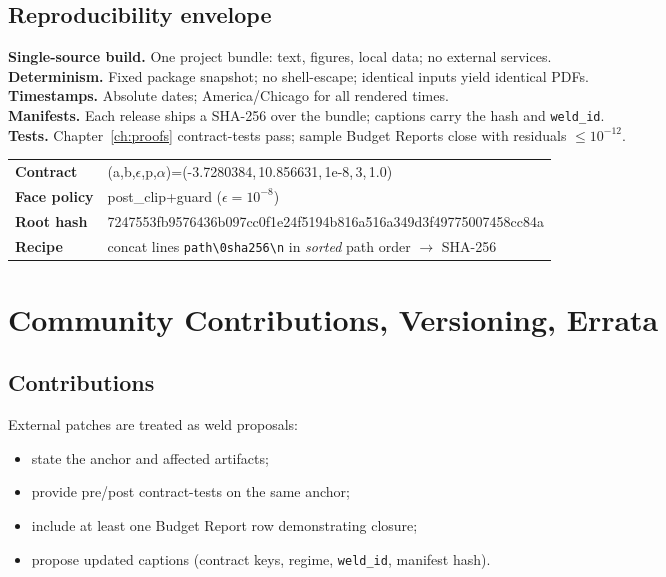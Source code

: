 \subsection*{Reproducibility envelope}
\begin{eqbox}
\textbf{Single-source build.} One project bundle: text, figures, local data; no external services.\\
\textbf{Determinism.} Fixed package snapshot; no shell-escape; identical inputs yield identical PDFs.\\
\textbf{Timestamps.} Absolute dates; America/Chicago for all rendered times.\\
\textbf{Manifests.} Each release ships a SHA-256 over the bundle; captions carry the hash and \texttt{weld\_id}.\\
\textbf{Tests.} Chapter~\ref{ch:proofs} contract-tests pass; sample Budget Reports close with residuals \(\le 10^{-12}\).
\end{eqbox}
\begin{eqbox}
\small
\begin{tabularx}{\linewidth}{@{}>{\bfseries}l >{\ttfamily}X@{}}
Contract         & (a,b,\(\epsilon\),p,\(\alpha\))=(-3.7280384,\,10.856631,\,1e-8,\,3,\,1.0) \\
Face policy      & post\_clip+guard (\(\epsilon=10^{-8}\)) \\
Root hash        & 7247553fb9576436b097cc0f1e24f5194b816a516a349d3f49775007458cc84a \\
Recipe           & concat lines \texttt{path\textbackslash0sha256\textbackslash n} in \emph{sorted} path order \(\rightarrow\) SHA-256 \\
\end{tabularx}
\end{eqbox}

\section{Community Contributions, Versioning, Errata}
\label{sec:community}

\subsection*{Contributions}
External patches are treated as weld proposals:
\begin{itemize}[leftmargin=1.25em]
  \item state the anchor and affected artifacts;
  \item provide pre/post contract-tests on the same anchor;
  \item include at least one Budget Report row demonstrating closure;
  \item propose updated captions (contract keys, regime, \texttt{weld\_id}, manifest hash).
\end{itemize}

